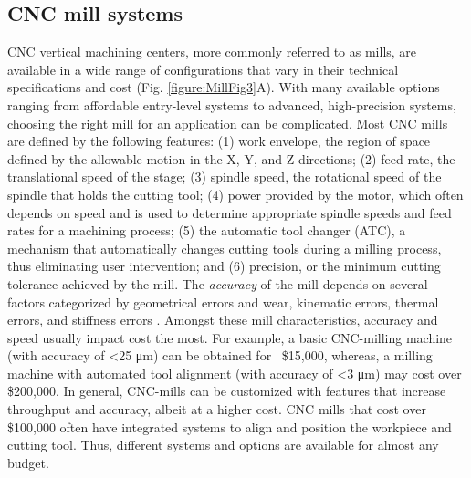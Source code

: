 {\subsection{CNC mill systems}
CNC vertical machining centers, more commonly referred to as mills, are available in a wide range of configurations that vary in their technical specifications and cost (Fig. \ref{figure:MillFig3}A). With many available options ranging from affordable entry-level systems to advanced, high-precision systems, choosing the right mill for an application can be complicated. Most CNC mills are defined by the following features: (1) work envelope, the region of space defined by the allowable motion in the X, Y, and Z directions; (2) feed rate, the translational speed of the stage; (3) spindle speed, the rotational speed of the spindle that holds the cutting tool; (4) power provided by the motor, which often depends on speed and is used to determine appropriate spindle speeds and feed rates for a machining process; (5) the automatic tool changer (ATC), a mechanism that automatically changes cutting tools during a milling process, thus eliminating user intervention; and (6) precision, or the minimum cutting tolerance achieved by the mill. The \textit{accuracy} of the mill depends on several factors categorized by geometrical errors and wear, kinematic errors, thermal errors, and stiffness errors \cite{Lamikiz2008}. Amongst these mill characteristics, accuracy and speed usually impact cost the most. For example, a basic CNC-milling machine (with accuracy of <25 μm) can be obtained for ~\$15,000, whereas, a milling machine with automated tool alignment (with accuracy of <3 μm) may cost over \$200,000. In general, CNC-mills can be customized with features that increase throughput and accuracy, albeit at a higher cost. CNC mills that cost over \$100,000 often have integrated systems to align and position the workpiece and cutting tool.  Thus, different systems and options are available for almost any budget.

}
